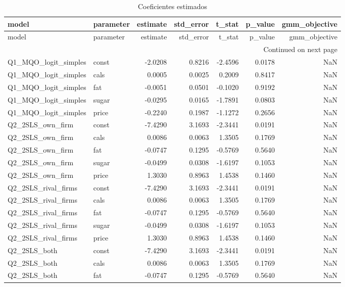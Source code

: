\scriptsize
\begin{longtable}{llrrrrr}
\caption{Coeficientes estimados}\label{tab:all-coef}\\
\toprule
model & parameter & estimate & std_error & t_stat & p_value & gmm_objective \\
\midrule
\endfirsthead
\toprule
model & parameter & estimate & std_error & t_stat & p_value & gmm_objective \\
\midrule
\endhead
\midrule
\multicolumn{7}{r}{Continued on next page} \\
\midrule
\endfoot
\bottomrule
\endlastfoot
Q1_MQO_logit_simples & const & -2.0208 & 0.8216 & -2.4596 & 0.0178 & NaN \\
Q1_MQO_logit_simples & cals & 0.0005 & 0.0025 & 0.2009 & 0.8417 & NaN \\
Q1_MQO_logit_simples & fat & -0.0051 & 0.0501 & -0.1020 & 0.9192 & NaN \\
Q1_MQO_logit_simples & sugar & -0.0295 & 0.0165 & -1.7891 & 0.0803 & NaN \\
Q1_MQO_logit_simples & price & -0.2240 & 0.1987 & -1.1272 & 0.2656 & NaN \\
Q2_2SLS_own_firm & const & -7.4290 & 3.1693 & -2.3441 & 0.0191 & NaN \\
Q2_2SLS_own_firm & cals & 0.0086 & 0.0063 & 1.3505 & 0.1769 & NaN \\
Q2_2SLS_own_firm & fat & -0.0747 & 0.1295 & -0.5769 & 0.5640 & NaN \\
Q2_2SLS_own_firm & sugar & -0.0499 & 0.0308 & -1.6197 & 0.1053 & NaN \\
Q2_2SLS_own_firm & price & 1.3030 & 0.8963 & 1.4538 & 0.1460 & NaN \\
Q2_2SLS_rival_firms & const & -7.4290 & 3.1693 & -2.3441 & 0.0191 & NaN \\
Q2_2SLS_rival_firms & cals & 0.0086 & 0.0063 & 1.3505 & 0.1769 & NaN \\
Q2_2SLS_rival_firms & fat & -0.0747 & 0.1295 & -0.5769 & 0.5640 & NaN \\
Q2_2SLS_rival_firms & sugar & -0.0499 & 0.0308 & -1.6197 & 0.1053 & NaN \\
Q2_2SLS_rival_firms & price & 1.3030 & 0.8963 & 1.4538 & 0.1460 & NaN \\
Q2_2SLS_both & const & -7.4290 & 3.1693 & -2.3441 & 0.0191 & NaN \\
Q2_2SLS_both & cals & 0.0086 & 0.0063 & 1.3505 & 0.1769 & NaN \\
Q2_2SLS_both & fat & -0.0747 & 0.1295 & -0.5769 & 0.5640 & NaN \\

\end{longtable}
